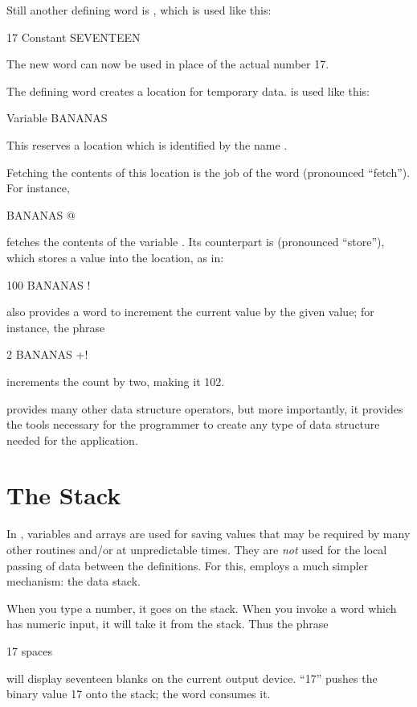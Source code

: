 Still another defining word is , which
is used like this:
\begin{Code}
17 Constant SEVENTEEN
\end{Code}
The new word  can now be used in place of the actual
number 17.

{\sloppy
The defining word  creates a location
for temporary data.  is used like this:
\begin{Code}
Variable BANANAS
\end{Code}
This reserves a location which is identified by the name .}

Fetching the contents of this location is the job of the word 
(pronounced ``fetch'').  For instance,
\begin{Code}
BANANAS @
\end{Code}
fetches the contents of the variable .  Its counterpart is
\forthb{!} (pronounced ``store''), which stores a value into the location,
as in:
\begin{Code}
100 BANANAS !
\end{Code}
\Forth{} also provides a word to increment the current value by the given
value; for instance, the phrase
\begin{Code}
2 BANANAS +!
\end{Code}
increments the count by two, making it 102.

\Forth{} provides many other
data structure operators, but more
importantly, it provides the tools necessary for the programmer to
create any type of data structure needed for the application.%
%

\section{The Stack}
In \Forth{}, variables and arrays are used for saving values that may be
required by many other routines and/or at unpredictable times.  They are
\emph{not} used for the local passing of data between the definitions.
For this, \Forth{} employs a much simpler mechanism: the data stack.

When you type a number, it goes on the stack.  When you invoke a word
which has numeric input, it will take it from the stack.  Thus the phrase
\begin{Code}
17 spaces
\end{Code}
will display seventeen blanks on the current output device.  ``17'' pushes
the binary value 17 onto the stack; the word  consumes it.

